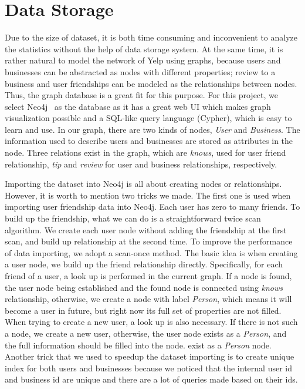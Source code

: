 \documentclass[10pt]{sig-alternate-10pt}   	%
\begin{document}
\section{Data Storage}
Due to the size of dataset, it is both time consuming and inconvenient to analyze the statistics without the help of data storage 
system. At the same time, it is rather natural to model the network of Yelp using graphs, because users and businesses can be
abstracted as nodes with different properties; review to a business and user friendships can be modeled as the relationships 
between nodes. Thus, the graph database is a great fit for this purpose. For this project, we select Neo4j~\cite{neo4j} as the
database as it has a great web UI which makes graph visualization possible and a SQL-like query language (Cypher), which is easy 
to learn and use. In our graph, there are two kinds of nodes, \textit{User} and \textit{Business}. 
The information used to describe users and businesses are stored as attributes in the node. Three relations exist in 
the graph, which are \textit{knows}, used for user friend relationship, \textit{tip} and \textit{review} for user and business 
relationships, respectively. 

Importing the dataset into Neo4j is all about creating nodes or relationships. However, it is worth to mention two tricks we 
made. The first one is used when importing user friendship data into Neo4j. Each user has zero to many friends. To build up 
the friendship, what we can do is a straightforward twice scan algorithm. We create each user node without adding the 
friendship at the first scan, and build up relationship at the second time. To improve the performance of data importing, we 
adopt a scan-once method. The basic idea is when creating a user node, we build up the friend relationship directly. 
Specifically, for each friend of a user, a look up is performed in the current graph. 
If a node is found, the user node being established and the found node is connected using \textit{knows} relationship, 
otherwise, we create a node with label \textit{Person}, which means it will become a user in future, but right now its full 
set of properties are not filled.  When trying to create a new user, a look up is also necessary. If there is not such a node, 
we create a new user, otherwise, the user node exists as a \textit{Person}, and the full information should be filled into the node. 
exist as a \textit{Person} node. Another trick that we used to speedup the dataset importing is to create unique index 
for both users and businesses because we noticed that the internal user id and business id are unique and there are 
a lot of queries made based on their ids.
  
\end{document}

